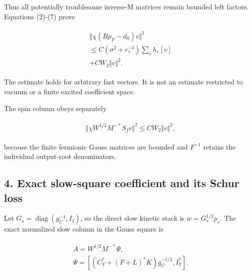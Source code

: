 Thus all potentially troublesome inverse-M matrices remain bounded left
factors. Equations (2)-(7) prove

\begin{gather*}
\begin{aligned}
& \Vert \chi  (B p_{F}-d_{0})v\Vert ^{2} \\
& \le  C (\sigma ^{2}+r_{*}^{-3}) \sum _{e} h_{e}[v] \\
& + C W_{2} \Vert v\Vert ^{2}.
\end{aligned}\tag{8}
\end{gather*}

The estimate holds for arbitrary fast vectors. It is not an estimate
restricted to vacuum or a finite excited coefficient space.

The spin column obeys separately

\begin{gather*}
\begin{aligned}
& \Vert \chi  W^{1/2}M^{-*} S_{f} v\Vert ^{2} \le  C W_{2} \Vert v\Vert ^{2},
\end{aligned}\tag{9}
\end{gather*}

because the finite fermionic Gauss matrices are bounded and \(F^{-1}\)
retains the individual output-root denominators.

\subsection{4. Exact slow-square coefficient and its Schur
loss}\label{e-exact-slow-square-coefficient-and-its-schur-loss}

Let \(G_{s}=\operatorname{diag} (g_{C}^{-1},I_{I})\), so the direct slow
kinetic stack is \(w=G_{s}^{1/2}p_{s}\). The exact normalized slow
column in the Gauss square is

\begin{gather*}
\begin{aligned}
& A=W^{1/2}M^{-*} \Psi , \\
& \Psi =[(C_{Y}^{*}+(F+L)^{*}K)g_{C}^{-1/2}, I_{Y}^{*}].
\end{aligned}\tag{10}
\end{gather*}

